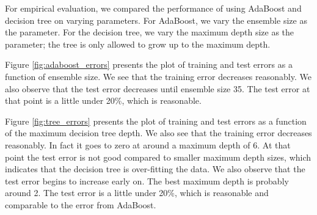 \documentclass{article} %
\begin{document}
For empirical evaluation, we compared the performance of using AdaBoost and decision tree on varying parameters. For AdaBoost, we vary the ensemble size as the parameter. For the decision tree, we vary the maximum depth size as the parameter; the tree is only allowed to grow up to the maximum depth.

Figure \ref{fig:adaboost_errors} presents the plot of training and test errors as a function of ensemble size. We see that the training error decreases reasonably. We also observe that the test error decreases until ensemble size 35. The test error at that point is a little under 20\%, which is reasonable.

Figure \ref{fig:tree_errors} presents the plot of training and test errors as a function of the maximum decision tree depth. We also see that the training error decreases reasonably. In fact it goes to zero at around a maximum depth of 6. At that point the test error is not good compared to smaller maximum depth sizes, which indicates that the decision tree is over-fitting the data. We also observe that the test error begins to increase early on. The best maximum depth is probably around 2. The test error is a little under 20\%, which is reasonable and comparable to the error from AdaBoost.
\end{document}

